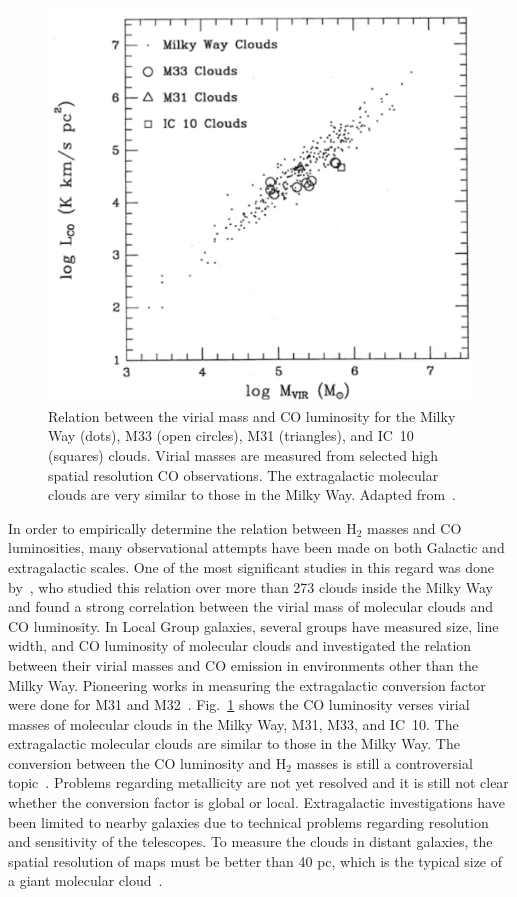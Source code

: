 \begin{figure}
\label{fig: mco}
\centering
\includegraphics[width=16cm]{../image_intro/mvirial_lco.pdf}
\caption{Relation between the virial mass and CO luminosity for the Milky Way (dots), M33 (open circles), M31 (triangles), and IC~10 (squares) clouds. Virial masses are measured from selected high spatial resolution CO observations. The extragalactic molecular clouds are very similar to those in the Milky Way. Adapted from~\cite{Young91}.}
\end{figure}

In order to empirically determine the relation between H$_2$ masses and CO luminosities, many observational attempts have been made on both Galactic and extragalactic scales. 
One of the most significant studies in this regard was done by~\cite{Solomon87}, who studied this relation over more than 273 clouds inside the Milky Way and found a strong correlation between the virial mass of molecular clouds and CO luminosity. 
In Local Group galaxies, several groups have measured size, line width, and CO luminosity of molecular clouds and investigated the relation between  their virial masses and CO emission in environments other than the Milky Way. 
Pioneering works in measuring the extragalactic conversion factor were done for M31 and M32~\citep[e.g.,][]{Wilson89, Wilson90}. 
Fig.~\ref{fig: mco} shows the CO luminosity verses virial masses of molecular clouds in the Milky Way, M31, M33, and IC~10. 
The extragalactic molecular clouds are similar to those in the Milky Way. 
The conversion between the CO luminosity and H$_2$ masses is still a controversial topic~\citep[e.g.][]{Narayanan11, Bolato13, Sandstrom13}.
Problems regarding metallicity are not yet resolved and it is still not clear whether the conversion factor is global or local. 
Extragalactic investigations have been limited to nearby galaxies due to technical problems regarding resolution and sensitivity of the telescopes. 
To measure the clouds in distant galaxies, the spatial resolution of maps must be better than 40 pc, which is the typical size of a giant molecular cloud~\citep[e.g.][and refrences therein]{Young91,Bolato13}. 

